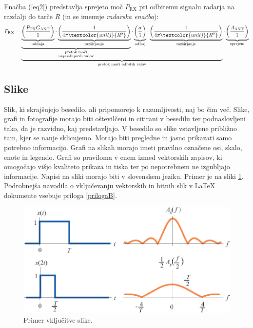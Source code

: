 \documentclass[a4paper,twoside,openright,12pt,slovene]{book}
\begin{document}
Enačba (\ref{eq2}) predstavlja sprejeto moč $P_\textrm{RX}$ pri odbitemu signalu radarja na razdalji do tarče $R$ (in se imenuje \emph{radarska enačba}):
\begin{equation} \label{eq2}
        P_{\textrm{RX}} =
    \underbrace{
    \underbrace{
    \underbrace{
            \left( \frac{P_{\textrm{TX}} G_{\textrm{ANT}}}{1} \right)
    }_{\textrm{oddaja}}
        \cdot
    \underbrace{
            \left( \frac{1}{4\pi \textcolor{unilj}{R^2}} \right)
    }_{\textrm{razširjanje}}
    }_{\substack{\textrm{pretok moči}\\\textrm{napredujočih valov}}}
        \cdot
    \underbrace{
            \left( \frac{\vphantom{1} \sigma}{1} \right) %
    }_{\textrm{odboj}}
        \cdot
    \underbrace{
            \left( \frac{1}{4\pi \textcolor{unilj}{R^2}} \right)
    }_{\textrm{razširjanje}}
    }_{\textrm{pretok moči odbitih valov}}
        \cdot
    \underbrace{
            \left( \frac{A_{\textrm{ANT}}}{1} \right)
    }_{\textrm{sprejem}}
\end{equation}

\subsection{Slike} \label{vnos_slik}

Slik, ki skrajšujejo besedilo, ali pripomorejo k razumljivosti, naj bo čim več. Slike, grafi in fotografije morajo biti oštevilčeni in citirani v besedilu ter podnaslovljeni tako, da je razvidno, kaj predstavljajo. V besedilo so slike vstavljene približno tam, kjer se nanje sklicujemo. Morajo biti pregledne in jasno prikazati samo potrebno informacijo. Grafi na slikah morajo imeti pravilno označene osi, skalo, enote in legendo. Grafi so praviloma v enem izmed vektorskih zapisov, ki omogočajo višjo kvaliteto prikaza in tiska ter po nepotrebnem ne izgubljajo informacije. Napisi na sliki morajo biti v slovenskem jeziku. Primer je na sliki \ref{oblika_signalov_1}. Podrobnejša navodila o vključevanju vektorskih in bitnih slik v LaTeX dokumente vsebuje priloga \ref{prilogaB}.

\begin{figure}[h]
    \centering
    \includegraphics[width=0.75\columnwidth]{Slike/vektorska_slika_1.eps}
    \caption{\label{oblika_signalov_1} Primer vključitve slike.}
\end{figure}
\end{document}
